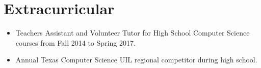 \documentclass[letterpaper,11pt]{article}
\newcommand{\resumeSubHeadingListStart}{\begin{itemize}[leftmargin=*]}
\newcommand{\resumeSubHeadingListEnd}{\end{itemize}}
\begin{document}
\section{Extracurricular}
  \resumeSubHeadingListStart
  	\item{Teachers Assistant and Volunteer Tutor for High School Computer Science courses from Fall 2014 to Spring 2017.}\vspace{-4pt}
    \item{Annual Texas Computer Science UIL regional competitor during high school.}\vspace{-4pt}
  \resumeSubHeadingListEnd


\end{document}
